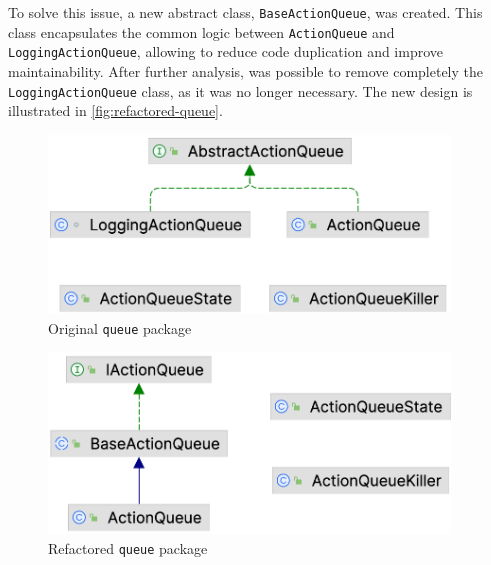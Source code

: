 To solve this issue, a new abstract class, \texttt{BaseActionQueue}, was created. This class encapsulates the common logic between \texttt{ActionQueue} and \texttt{LoggingActionQueue}, allowing to reduce code duplication and improve maintainability. After further analysis, was possible to remove completely the \texttt{LoggingActionQueue} class, as it was no longer necessary. The new design is illustrated in \autoref{fig:refactored-queue}.

\begin{minipage}{0.5\linewidth}
	\begin{figure}[H]
		\begin{center}
			\includegraphics[width=0.95\textwidth]{figures/queue_package/original.png}
			\caption{Original \texttt{queue} package}
			\label{fig:original-queue}
		\end{center}
	\end{figure}
\end{minipage}
\begin{minipage}{0.5\linewidth}
	\begin{figure}[H]
		\begin{center}
			\includegraphics[width=0.95\textwidth]{figures/queue_package/refactored.png}
			\caption{Refactored \texttt{queue} package}
			\label{fig:refactored-queue}
		\end{center}
	\end{figure}
\end{minipage}

